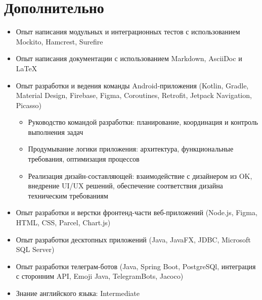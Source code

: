 \documentclass[a4paper,9pt]{report}
\newcommand{\bulletItem}[1]{\item[$\bullet$] #1}
\begin{document}
\section{Дополнительно}

\begin{itemize}
\bulletItem{Опыт написания модульных и интеграционных тестов с использованием Mockito, Hamcrest, Surefire}
\bulletItem{Опыт написания документации с использованием Markdown, AsciiDoc и LaTeX}
\bulletItem{Опыт разработки и ведения команды Android-приложения (Kotlin, Gradle, Material Design, Firebase, Figma, Coroutines, Retrofit, Jetpack Navigation, Picasso)}
\begin{itemize}
\bulletItem Руководство командой разработки: планирование, координация и контроль выполнения задач
\bulletItem Продумывание логики приложения: архитектура, функциональные требования, оптимизация процессов
\bulletItem Реализация дизайн-составляющей: взаимодействие с дизайнером из OK, внедрение UI/UX решений, обеспечение соответствия дизайна техническим требованиям
\end{itemize}
\bulletItem{Опыт разработки и верстки фронтенд-части веб-приложений (Node.js, Figma, HTML, CSS, Parcel, Chart.js)}
\bulletItem{Опыт разработки десктопных приложений (Java, JavaFX, JDBC, Microsoft SQL Server)}
\bulletItem{Опыт разработки телеграм-ботов (Java, Spring Boot, PostgreSQl, интеграция с сторонним API, Emoji Java, TelegramBots, Jacoco)}
\bulletItem{Знание английского языка: Intermediate}
\end{itemize}
\end{document}
